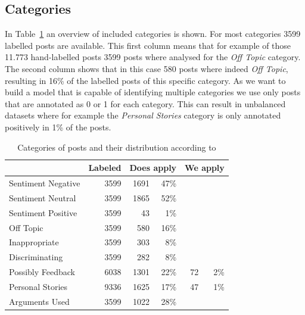 \documentclass[11pt,a4paper]{article}
\begin{document}
\subsection{Categories}
In Table~\ref{tab:categories} an overview of included categories is shown. For most categories 3599 labelled posts are available. This first column means that for example of those 11.773 hand-labelled posts 3599 posts where analysed for the \textit{Off Topic} category. The second column shows that in this case 580 posts where indeed \textit{Off Topic}, resulting in 16\% of the labelled posts of this specific category. As we want to build a model that is capable of identifying multiple categories we use only posts that are annotated as 0 or 1 for each category. This can result in unbalanced datasets where for example the \textit{Personal Stories} category is only annotated positively in 1\% of the posts. 
\begin{table}[t!]
	\centering
	\begin{tabular}{l r r r r r}
		& Labeled & \multicolumn{2}{c}{Does apply} & \multicolumn{2}{c}{We apply} \\
		\hline
		Sentiment Negative & 3599 & 1691 & 47\% \\
		Sentiment Neutral & 3599 & 1865 & 52\% \\
		Sentiment Positive & 3599 & 43 & 1\% \\
		Off Topic & 3599 & 580 & 16\% \\
		Inappropriate & 3599 & 303 & 8\%\\
		Discriminating & 3599 & 282 & 8\%\\
		Possibly Feedback & 6038 & 1301 & 22\% & 72 & 2\%\\
		Personal Stories & 9336 & 1625 & 17\% & 47 & 1\%\\
		Arguments Used & 3599 & 1022 & 28\%\\
	\end{tabular}
	\caption{Categories of posts and their distribution according to \cite{Schabus17}}
	\label{tab:categories}
\end{table}


\end{document}
